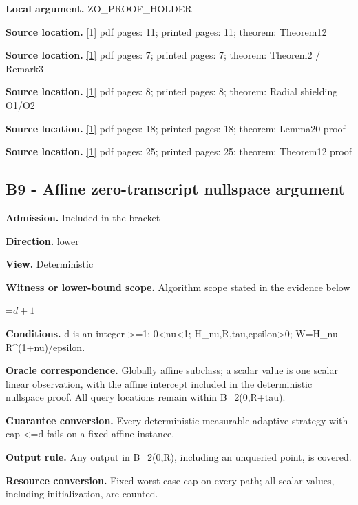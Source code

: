 \documentclass[10pt,a4paper]{article}
\newcommand{\AtlasMath}[1]{\par\begingroup\centering\setbox0=\hbox{$\displaystyle #1$}\ifdim\wd0>1.4\linewidth\typeout{ATLAS WIDE FORMULA: \the\wd0}\fi\ifdim\wd0>\linewidth\resizebox{\linewidth}{!}{\box0}\else\box0\fi\par\endgroup}
\begin{document}
\textbf{Local argument.} ZO\_\allowbreak{}PROOF\_\allowbreak{}HOLDER

\textbf{Source location.} \href{https://proceedings.mlr.press/v99/diakonikolas19c/diakonikolas19c.pdf}{[1]} pdf pages: 11; printed pages: 11; theorem: Theorem12

\textbf{Source location.} \href{https://proceedings.mlr.press/v99/diakonikolas19c/diakonikolas19c.pdf}{[1]} pdf pages: 7; printed pages: 7; theorem: Theorem2 / Remark3

\textbf{Source location.} \href{https://proceedings.mlr.press/v99/diakonikolas19c/diakonikolas19c.pdf}{[1]} pdf pages: 8; printed pages: 8; theorem: Radial shielding O1/O2

\textbf{Source location.} \href{https://proceedings.mlr.press/v99/diakonikolas19c/diakonikolas19c.pdf}{[1]} pdf pages: 18; printed pages: 18; theorem: Lemma20 proof

\textbf{Source location.} \href{https://proceedings.mlr.press/v99/diakonikolas19c/diakonikolas19c.pdf}{[1]} pdf pages: 25; printed pages: 25; theorem: Theorem12 proof

\subsection{B9 - Affine zero-transcript nullspace argument}
\textbf{Admission.} Included in the bracket

\textbf{Direction.} lower

\textbf{View.} Deterministic

\textbf{Witness or lower-bound scope.} Algorithm scope stated in the evidence below

\AtlasMath{d+1}
\textbf{Conditions.} d is an integer >=1; 0<nu<1; H\_\allowbreak{}nu,R,tau,epsilon>0; W=H\_\allowbreak{}nu R\textasciicircum{}(1+nu)/epsilon.

\textbf{Oracle correspondence.} Globally affine subclass; a scalar value is one scalar linear observation, with the affine intercept included in the deterministic nullspace proof. All query locations remain within B\_\allowbreak{}2(0,R+tau).

\textbf{Guarantee conversion.} Every deterministic measurable adaptive strategy with cap <=d fails on a fixed affine instance.

\textbf{Output rule.} Any output in B\_\allowbreak{}2(0,R), including an unqueried point, is covered.

\textbf{Resource conversion.} Fixed worst-case cap on every path; all scalar values, including initialization, are counted.
\end{document}
